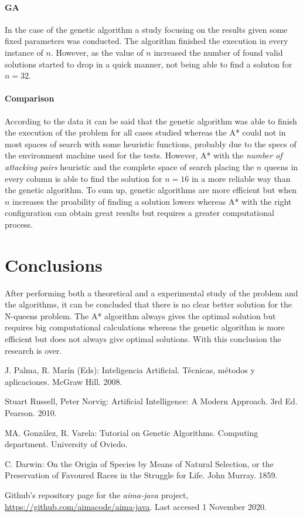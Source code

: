 \documentclass[]{llncs}
\begin{document}
\paragraph{GA}
In the case of the genetic algorithm a study focusing on the results given some fixed parameters was conducted. The algorithm finished the execution in every instance of $n$. However, as the value of $n$ increased the number of found valid solutions started to drop in a quick manner, not being able to find a soluton for $n = 32$. 

\paragraph{Comparison}
According to the data it can be said that the genetic algorithm was able to finish the execution of the problem for all cases studied whereas the A* could not in most spaces of search with some heuristic functions, probably due to the specs of the environment machine used for the tests. However, A* with the \textit{number of attacking pairs} heuristic and the complete space of search placing the $n$ queens in every column is able to find the solution for $n = 16$ in a more reliable way than the genetic algorithm. To sum up, genetic algorithms are more efficient but when $n$ increases the proability of finding a solution lowers whereas A* with the right configuration can obtain great results but requires a greater computational process.

\section{Conclusions}\label{conclusions}
After performing both a theoretical and a experimental study of the problem and the algorithms, it can be concluded that there is no clear better solution for the N-queens problem. The A* algorithm always gives the optimal solution but requires big computational calculations whereas the genetic algorithm is more efficient but does not always give optimal solutions. With this conclusion the research is over.
\begin{thebibliography}{8}
J. Palma, R. Marín (Eds): Inteligencia Artificial. Técnicas, métodos y aplicaciones. McGraw Hill. 2008.

Stuart Russell, Peter Norvig: Artificial Intelligence: A Modern Approach. 3rd Ed. Pearson. 2010.

MA. González, R. Varela: Tutorial on Genetic Algorithms. Computing department. University of Oviedo.

C. Darwin: On the Origin of Species by Means of Natural Selection, or the Preservation of Favoured Races in the Struggle for Life. John Murray. 1859.
 
Github's repository page for the \textit{aima-java} project, \url{https://github.com/aimacode/aima-java}. Last accesed 1 November 2020.
\end{thebibliography}
\end{document}
